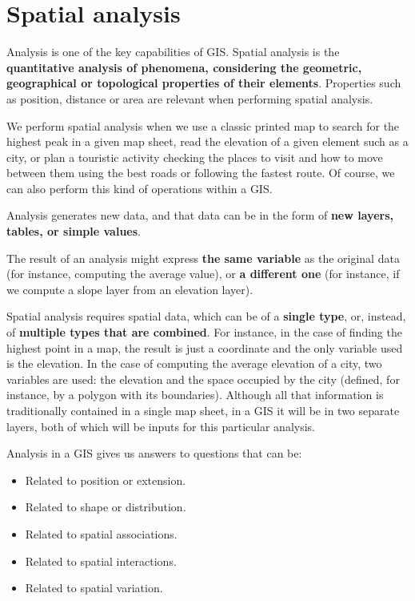 
\chapter{Spatial analysis}



\pagestyle{fancy}

Analysis is one of the key capabilities of GIS. Spatial analysis is the \textbf{quantitative analysis of phenomena, considering the geometric, geographical or topological properties of their elements}. Properties such as position, distance or area are relevant when performing spatial analysis.

We perform spatial analysis when we use a classic printed map to search for the highest peak in a given map sheet, read the elevation of a given element such as a city, or plan a touristic activity checking the places to visit and how to move between them using the best roads or following the fastest route. Of course, we can also perform this kind of operations within a GIS.

Analysis generates new data, and that data can be in the form of \textbf{new layers, tables, or simple values}.

The result of an analysis might express \textbf{the same variable} as the original data (for instance, computing the average value), or \textbf{a different one} (for instance, if we compute a slope layer from an elevation layer).

Spatial analysis requires spatial data, which can be of a \textbf{single type}, or, instead, of \textbf{multiple types that are combined}. For instance, in the case of finding the highest point in a map, the result is just a coordinate and the only variable used is the elevation. In the case of computing the average elevation of a city, two variables are used: the elevation and the space occupied by the city (defined, for instance, by a polygon with its boundaries). Although all that information is traditionally contained in a single map sheet, in a GIS it will be in two separate layers, both of which will be inputs for this particular analysis.

Analysis in a GIS gives us answers to questions that can be:

\begin{itemize}
 \item Related to position or extension.
\item Related to shape or distribution.
\item Related to spatial associations.
\item Related to spatial interactions.
\item Related to spatial variation.
\end{itemize}


